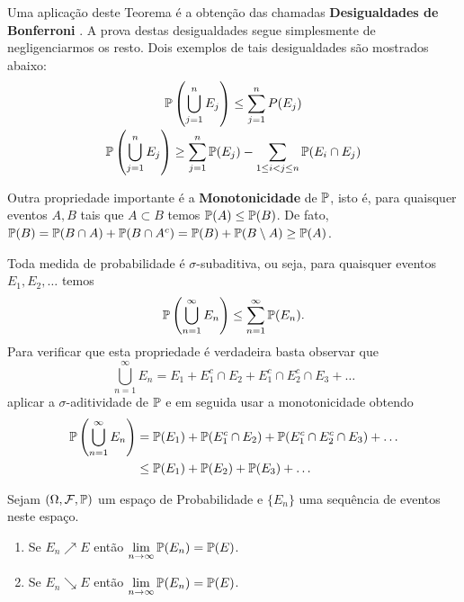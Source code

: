 Uma aplicação deste Teorema é a obtenção das
chamadas {\bf Desigualdades de Bonferroni} .
A prova destas desigualdades segue simplesmente de negligenciarmos 
os resto. Dois exemplos de tais desigualdades são mostrados
abaixo:
\[ 
\begin{array}{c}
	\displaystyle
	\P \left( \bigcup_{j=1}^{n} E_j \right) 
	\leq 
	\sum_{j=1}^n P(E_j)
	\\[0.5cm]
	\displaystyle
	\P \left( \bigcup_{j=1}^{n} E_j \right) 
	\geq
	\sum_{j=1}^n \P(E_j) - \sum_{1\leq i<j\leq n} \P(E_i\cap E_j)	
\end{array}
\]

Outra propriedade importante é a {\bf Monotonicidade} de $\P$, isto é, 
para quaisquer eventos $A,B$ tais que $A\subset B$ temos 
$\P(A)\leq \P(B)$. De fato, 
$\P(B)=\P(B\cap A)+\P(B\cap A^c)= \P(B)+\P(B\setminus A)\geq \P(A)$.

Toda medida de probabilidade é $\sigma$-subaditiva, ou seja, 
para quaisquer eventos $E_1,E_2,\ldots$ temos 
	\[
		\P\left( \bigcup_{n=1}^{\infty} E_n\right)
		\leq 
		\sum_{n=1}^{\infty} \P(E_n).
	\]
Para verificar que esta propriedade é verdadeira basta observar que 
\[
	\bigcup_{n=1}^{\infty} E_n = E_1+E_1^c\cap E_2 + E_1^c\cap E_2^c\cap E_3 +\ldots
\]
aplicar a $\sigma$-aditividade de $\P$ e em seguida usar a monotonicidade 
obtendo
	\begin{align*}
	\P\left( \bigcup_{n=1}^{\infty} E_n\right)
	&=
	\P(E_1)+\P(E_1^c\cap E_2) + \P(E_1^c\cap E_2^c\cap E_3) +\ldots
	\\
	&\leq
	\P(E_1) + \P(E_2) + \P(E_3) +\ldots
	\end{align*}
	
\begin{teorema}
	Sejam $(\Omega,\F,\P)$ um espaço de Probabilidade e
	$\{E_n\}$ uma sequência de eventos neste espaço.
	\begin{enumerate}
		\item
		Se $E_n\nearrow E$ então 
		$\displaystyle\lim_{n\to\infty}\P(E_n)=\P(E)$.
		\item 
		Se $E_n\searrow E$ então 
		$\displaystyle\lim_{n\to\infty}\P(E_n)=\P(E)$.		
	\end{enumerate}
\end{teorema}


